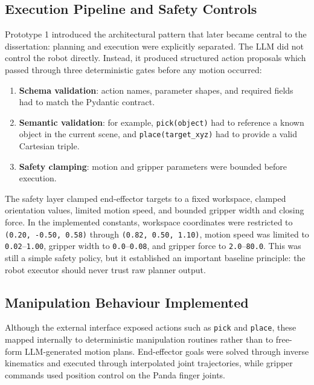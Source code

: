\documentclass[12pt,a4paper]{article}
\begin{document}
\subsection{Execution Pipeline and Safety Controls}

Prototype 1 introduced the architectural pattern that later became central to the dissertation: planning and execution were explicitly separated. The LLM did not control the robot directly. Instead, it produced structured action proposals which passed through three deterministic gates before any motion occurred:

\begin{enumerate}
	\item \textbf{Schema validation}: action names, parameter shapes, and required fields had to match the Pydantic contract.
	\item \textbf{Semantic validation}: for example, \texttt{pick(object)} had to reference a known object in the current scene, and \texttt{place(target\_xyz)} had to provide a valid Cartesian triple.
	\item \textbf{Safety clamping}: motion and gripper parameters were bounded before execution.
\end{enumerate}

The safety layer clamped end-effector targets to a fixed workspace, clamped orientation values, limited motion speed, and bounded gripper width and closing force. In the implemented constants, workspace coordinates were restricted to \texttt{(0.20, -0.50, 0.58)} through \texttt{(0.82, 0.50, 1.10)}, motion speed was limited to \texttt{0.02}--\texttt{1.00}, gripper width to \texttt{0.0}--\texttt{0.08}, and gripper force to \texttt{2.0}--\texttt{80.0}. This was still a simple safety policy, but it established an important baseline principle: the robot executor should never trust raw planner output.

\subsection{Manipulation Behaviour Implemented}

Although the external interface exposed actions such as \texttt{pick} and \texttt{place}, these mapped internally to deterministic manipulation routines rather than to free-form LLM-generated motion plans. End-effector goals were solved through inverse kinematics and executed through interpolated joint trajectories, while gripper commands used position control on the Panda finger joints.
\end{document}
